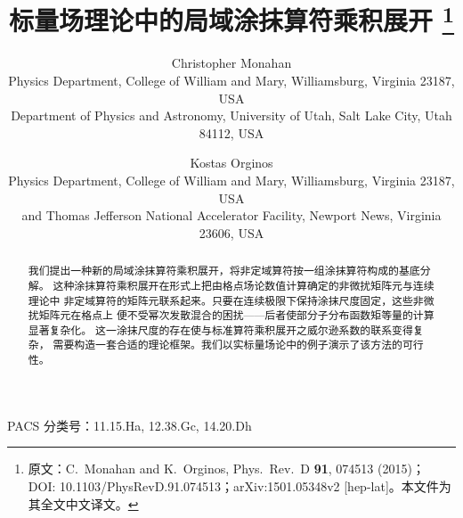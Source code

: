 \documentclass[11pt]{ctexart}
\title{标量场理论中的局域涂抹算符乘积展开%
\thanks{原文：C.\ Monahan and K.\ Orginos, Phys.\ Rev.\ D \textbf{91}, 074513 (2015)；
DOI: 10.1103/PhysRevD.91.074513；arXiv:1501.05348v2 [hep-lat]。本文件为其全文中文译文。}}
\author{Christopher Monahan \\[1mm] \small Physics Department, College of William and Mary,
Williamsburg, Virginia 23187, USA \\ \small Department of Physics and Astronomy, University of Utah,
Salt Lake City, Utah 84112, USA
\and Kostas Orginos \\[1mm] \small Physics Department, College of William and Mary,
Williamsburg, Virginia 23187, USA \\ \small and Thomas Jefferson National Accelerator Facility,
Newport News, Virginia 23606, USA}
\date{}
\begin{document}
\maketitle

\begin{abstract}
我们提出一种新的局域涂抹算符乘积展开，将非定域算符按一组涂抹算符构成的基底分解。
这种涂抹算符乘积展开在形式上把由格点场论数值计算确定的非微扰矩阵元与连续理论中
非定域算符的矩阵元联系起来。只要在连续极限下保持涂抹尺度固定，这些非微扰矩阵元在格点上
便不受幂次发散混合的困扰——后者使部分子分布函数矩等量的计算显著复杂化。
这一涂抹尺度的存在使与标准算符乘积展开之威尔逊系数的联系变得复杂，
需要构造一套合适的理论框架。我们以实标量场论中的例子演示了该方法的可行性。
\end{abstract}

\noindent PACS 分类号：11.15.Ha, 12.38.Gc, 14.20.Dh

\bigskip









\end{document}
